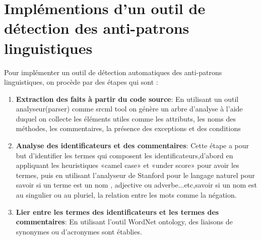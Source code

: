 \section{Implémentions d’un outil de  détection des anti-patrons linguistiques}
Pour implémenter un outil de détection automatiques des anti-patrons linguistiques, on procède par des étapes qui sont \cite{arnaoudova2013new}:\\
\begin{enumerate}
    

\item \textbf {Extraction des faits à partir du code source}: En utilisant un outil analyseur(parser) comme srcml tool on génère un arbre d’analyse à l’aide duquel on collecte les éléments utiles comme les attributs, les noms des méthodes, les commentaires, la présence des exceptions et des conditions
\item \textbf {Analyse des identificateurs et des commentaires}:
Cette étape a pour but d’identifier les termes qui composent les identificateurs,d’abord en appliquant les heuristiques «camel case» et «under score» pour avoir les termes, puis en utilisant l’analyseur de Stanford pour le langage naturel pour savoir si un terme est un nom , adjective ou adverbe...etc,savoir si un nom est au singulier ou au pluriel, la relation entre les mots comme la négation.
\item \textbf{Lier entre les termes des identificateurs et les termes des commentaires}: En utilisant l’outil WordNet ontology, des liaisons de synonymes ou  d’acronymes sont établies.
\end{enumerate}

